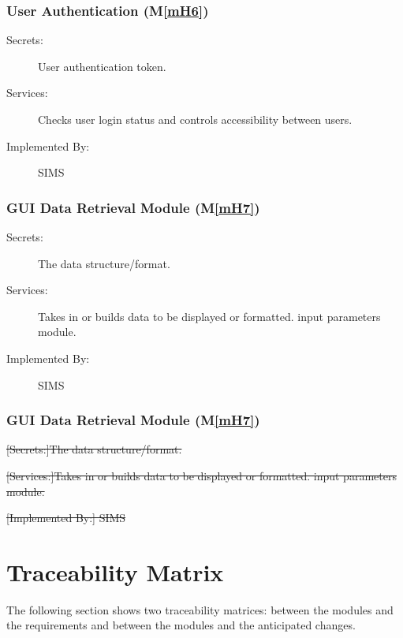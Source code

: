 \documentclass[12pt, titlepage]{article}
\newcommand{\mref}[1]{M\ref{#1}}
\begin{document}
\subsubsection{User Authentication (\mref{mH6})}
\begin{description}
\item[Secrets:] User authentication token.
\item[Services:] Checks user login status and controls accessibility between users.
\item[Implemented By:] SIMS
\end{description}

\subsubsection{GUI Data Retrieval Module (\mref{mH7})}
\begin{description}
\item[Secrets:]The data structure/format.
\item[Services:]Takes in or builds data to be displayed or formatted.
  input parameters module.
\item[Implemented By:] SIMS
\end{description}
{
\subsubsection{GUI Data Retrieval Module (\mref{mH7})}
\begin{description}
\item\sout{[Secrets:]The data structure/format.}
\item\sout{[Services:]Takes in or builds data to be displayed or formatted.
  input parameters module.}
\item\sout{[Implemented By:] SIMS}
\end{description}
}
\section{Traceability Matrix} \label{SecTM}

The following section shows two traceability matrices: between the modules and the
requirements and between the modules and the anticipated changes.
\end{document}
